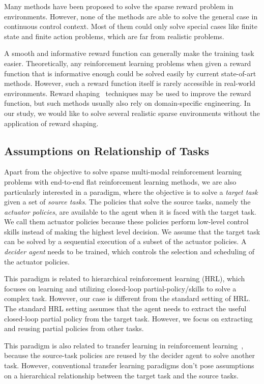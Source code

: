 Many methods have been proposed to solve the sparse reward problem in environments. However, none of the methods are able to solve the general case in continuous control context. Most of them could only solve special cases like finite state and finite action problems, which are far from realistic problems.

A smooth and informative reward function can generally make the training task easier. Theoretically, any reinforcement learning problems when given a reward function that is informative enough could be solved easily by current state-of-art methods. However, such a reward function itself is rarely accessible in real-world environments. Reward shaping~\cite{ng1999policy} techniques may be used to improve the reward function, but such methods usually also rely on domain-specific engineering. In our study, we would like to solve several realistic sparse environments without the application of reward shaping.


\subsection{Assumptions on Relationship of Tasks}
Apart from the objective to solve sparse multi-modal reinforcement learning problems with end-to-end flat reinforcement learning methods, we are also particularly interested in a paradigm, where the objective is to solve a \textit{target task} given a set of \textit{source tasks}. The policies that solve the source tasks, namely the \textit{actuator policies}, are available to the agent when it is faced with the target task. We call them actuator policies because these policies perform low-level control skills instead of making the highest level decision. We assume that the target task can be solved by a sequential execution of a subset of the actuator policies. A \textit{decider agent} needs to be trained, which controls the selection and scheduling of the actuator policies.

This paradigm is related to hierarchical reinforcement learning (HRL), which focuses on learning and utilizing closed-loop partial-policy/skills to solve a complex task. However, our case is different from the standard setting of HRL. The standard HRL setting assumes that the agent needs to extract the useful closed-loop partial policy from the target task. However, we focus on extracting and reusing partial policies from other tasks.

This paradigm is also related to transfer learning in reinforcement learning~\cite{taylor2009transfer}, because the source-task policies are reused by the decider agent to solve another task. However, conventional transfer learning paradigms don't pose assumptions on a hierarchical relationship between the target task and the source tasks.

